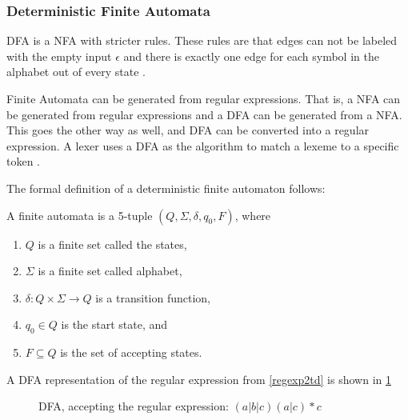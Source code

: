 \subsubsection{Deterministic Finite Automata}
DFA is a NFA with stricter rules. These rules are that edges can not be labeled
with the empty input $\epsilon$ and there is exactly one edge for each symbol
in the alphabet out of every state \cite{Aho2006}.

Finite Automata can be generated from regular expressions. That is, a
NFA can be generated from regular expressions and a DFA can be generated from a
NFA. This goes the other way as well, and DFA can be converted into a regular
expression. A lexer uses a DFA as the algorithm to match a
lexeme to a specific token \cite{Aho2006}.

The formal definition of a deterministic finite automaton follows:
\begin{definition} \label{finiteAutomataDef}
A finite automata is a 5-tuple $(Q, \Sigma, \delta, q_0, F)$, where
\begin{enumerate}
  \item $Q$ is a finite set called the states,
  \item $\Sigma$ is a finite set called alphabet,
  \item $\delta: Q \times \Sigma \to Q$ is a transition function,
  \item $q_0 \in Q$ is the start state, and
  \item $F \subseteq Q$ is the set of accepting states.
\end{enumerate} 
\end{definition}
\hfill 
\break
\begin{example} \label{regexp2dfa}
A DFA representation of the regular expression from \cref{regexp2td} is shown in \cref{fig:dfa}
\end{example}
\begin{figure}[!h]
  \centering
  \caption{DFA, accepting the regular expression: $(a|b|c)(a|c)* c$
  \label{fig:dfa}}
\end{figure}

